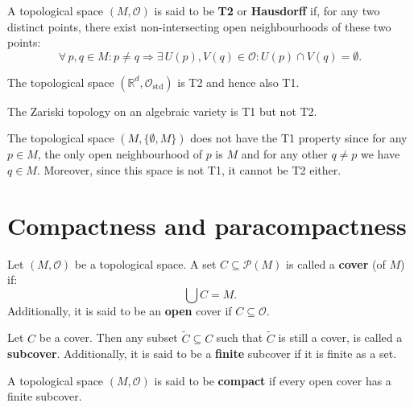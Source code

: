 \documentclass[root.tex]{subfiles}
\begin{document}
\begin{mydef}
A topological space $(M,\mathcal{O})$ is said to be \textbf{T2} or \textbf{Hausdorff} if, for any two distinct points, there exist non-intersecting open neighbourhoods of these two points:
$$
\forall \, p,q\in M : p\neq q \Rightarrow \exists \, U(p),V(q)\in \mathcal{O} : U(p)\cap V(q) = \emptyset.
$$
\end{mydef}
%
\begin{myex}
  The topological space $(\mathbb{R}^d,\mathcal{O}_\mathrm{std})$ is T2 and hence also T1.
\end{myex}

\begin{myex}
The Zariski topology on an algebraic variety is T1 but not T2.
\end{myex}

\begin{myex}
The topological space $(M,\{\emptyset,M\})$ does not have the T1 property since for any $p \in M$, the only open neighbourhood of $p$ is $M$ and for any other $q\neq p$ we have $q\in M$. Moreover, since this space is not T1, it cannot be T2 either.
\end{myex}

\section{Compactness and paracompactness}

\begin{mydef}
  Let $(M,\mathcal{O})$ be a topological space. A set $C \subseteq \mathcal{P}(M)$ is called a \textbf{cover} (of $M$) if:
$$
\bigcup C = M.
$$
Additionally, it is said to be an \textbf{open} cover if $C \subseteq \mathcal{O}$.
\end{mydef}

\begin{mydef}
Let $C$ be a cover. Then any subset $\widetilde{C}\subseteq C$ such that $\widetilde{C}$ is still a cover, is called a \textbf{subcover}. Additionally, it is said to be a \textbf{finite} subcover if it is finite as a set.
\end{mydef}

\begin{mydef}
A topological space $(M,\mathcal{O})$ is said to be \textbf{compact} if every open cover has a finite subcover.
\end{mydef}
\end{document}
